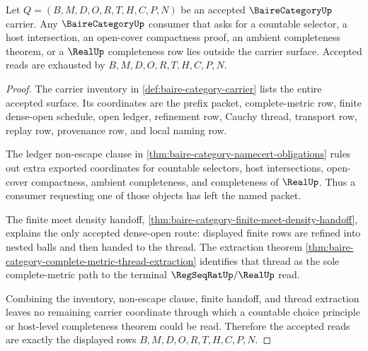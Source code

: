 \begin{theorem}
\label{thm:baire-category-countable-choice-refusal}
Let $Q=(B,M,D,O,R,T,H,C,P,N)$ be an accepted $\BaireCategoryUp$ carrier. Any
$\BaireCategoryUp$ consumer that asks for a countable selector, a host
intersection, an open-cover compactness proof, an ambient completeness theorem,
or a $\RealUp$ completeness row lies outside the carrier surface. Accepted
reads are exhausted by $B,M,D,O,R,T,H,C,P,N$.
\end{theorem}
\begin{proof}
The carrier inventory in \autoref{def:baire-category-carrier} lists the entire
accepted surface. Its coordinates are the prefix packet, complete-metric row,
finite dense-open schedule, open ledger, refinement row, Cauchy thread,
transport row, replay row, provenance row, and local naming row.

The ledger non-escape clause in
\autoref{thm:baire-category-namecert-obligations} rules out extra exported
coordinates for countable selectors, host intersections, open-cover compactness,
ambient completeness, and completeness of $\RealUp$. Thus a consumer requesting
one of those objects has left the named packet.

The finite meet density handoff,
\autoref{thm:baire-category-finite-meet-density-handoff}, explains the only
accepted dense-open route: displayed finite rows are refined into nested balls
and then handed to the thread. The extraction theorem
\autoref{thm:baire-category-complete-metric-thread-extraction} identifies that
thread as the sole complete-metric path to the terminal
$\RegSeqRatUp/\RealUp$ read.

Combining the inventory, non-escape clause, finite handoff, and thread
extraction leaves no remaining carrier coordinate through which a countable
choice principle or host-level completeness theorem could be read. Therefore
the accepted reads are exactly the displayed rows
$B,M,D,O,R,T,H,C,P,N$.
\end{proof}

